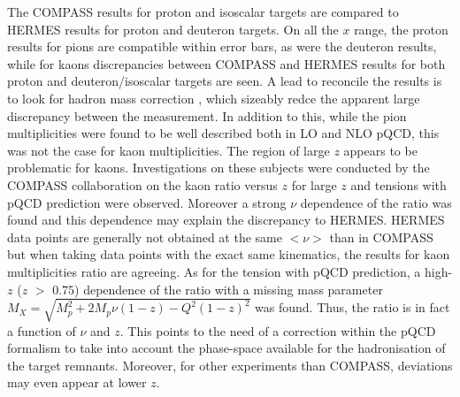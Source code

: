 The COMPASS results for proton and isoscalar targets are compared to HERMES results for proton and deuteron targets. On all the $x$ range, the proton results for pions are compatible within error bars, as were the deuteron results, while for kaons discrepancies between COMPASS and HERMES results for both proton and deuteron/isoscalar targets are seen. A lead to reconcile the results is to look for hadron mass correction \cite{Accardi}, which sizeably redce the apparent large discrepancy between the measurement. In addition to this, while the pion multiplicities were found to be well described both in LO and NLO pQCD, this was not the case for kaon multiplicities. The region of large $z$ appears to be problematic for kaons. Investigations on these subjects were conducted by the COMPASS collaboration on the kaon ratio versus $z$ for large $z$ \cite{MarcinPubli} and tensions with pQCD prediction were observed. Moreover a strong $\nu$ dependence of the ratio was found and this dependence may explain the discrepancy to HERMES. HERMES data points are generally not obtained at the same $<\nu>$ than in COMPASS but when taking data points with the exact same kinematics, the results for kaon multiplicities ratio are agreeing. As for the tension with pQCD prediction, a high-$z$ ($z$ $>$ $0.75$) dependence of the ratio with a missing mass parameter $M_X = \sqrt{M^2_p + 2M_p \nu (1-z) - Q^2 (1-z)^2}$ was found. Thus, the ratio is in fact a function of $\nu$ and $z$. This points to the need of a correction within the pQCD formalism to take into account the phase-space available for the hadronisation of the target remnants. Moreover, for other experiments than COMPASS, deviations may even appear at lower $z$.

